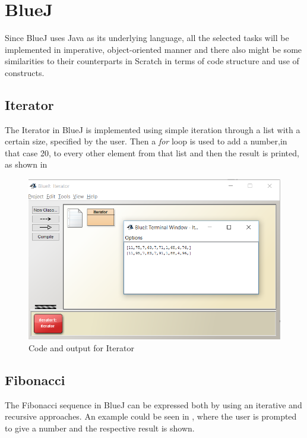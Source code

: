 \section{BlueJ}
\label{sec:bluej}



Since BlueJ uses Java as its underlying language, all the selected tasks will be implemented in imperative, object-oriented manner and there also might be some similarities to their counterparts in Scratch in terms of code structure and use of constructs.
\subsection{Iterator}
The Iterator in BlueJ is implemented using simple iteration through a list with a certain size, specified by the user. Then a \textit{for} loop is used to add a number,in that case 20, to every other element from that list and then the result is printed, as shown in 

\begin{figure}[!h]
  \centering
      \includegraphics[scale=0.7]{./pics/bluej_iterator_code}
      \caption{Code and output for Iterator}
      \label{fig:bluej_iterator_code} 
\end{figure}

\subsection{Fibonacci}
The Fibonacci sequence in BlueJ can be expressed both by using an iterative and recursive approaches. An example could be seen in , where the user is prompted to give a number and the respective result is shown.

